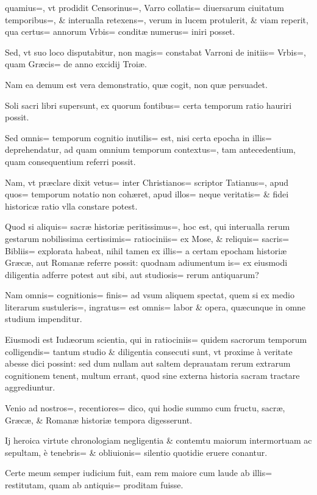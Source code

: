 \begin{parnumbers}

quamius=, vt prodidit Censorinus=, Varro collatis= diuersarum ciuitatum temporibus=, \& interualla retexens=, verum in lucem protulerit, \& viam reperit, qua certus=
annorum Vrbis= conditæ numerus= iniri posset.

Sed, vt suo loco disputabitur, non magis= constabat Varroni de initiis= Vrbis=, quam Græcis= de anno excidij Troiæ.

Nam ea demum est vera demonstratio, quæ cogit, non quæ persuadet.

Soli sacri libri supersunt, ex quorum fontibus= certa temporum ratio hauriri possit.

Sed omnis= temporum cognitio inutilis= est, nisi certa epocha in illis= deprehendatur, ad quam omnium temporum contextus=, tam antecedentium, quam consequentium referri possit.

Nam, vt præclare dixit vetus= inter Christianos= scriptor Tatianus=, apud quos= temporum notatio non cohæret, apud illos= neque veritatis= \& fidei historicæ ratio vlla constare potest.

Quod si aliquis= sacræ historiæ peritissimus=, hoc est, qui interualla rerum gestarum
nobilissima certissimis= ratiociniis= ex Mose, \& reliquis= sacris= Bibliis= explorata habeat, nihil tamen ex illis= a certam epocham historiæ Græcæ, aut Romanæ referre possit: quodnam adiumentum is= ex eiusmodi diligentia adferre potest aut sibi, aut studiosis= rerum antiquarum?

Nam omnis= cognitionis= finis= ad vsum aliquem spectat, quem si ex medio literarum sustuleris=, ingratus= est omnis= labor \& opera, quæcunque in omne studium impenditur.

Eiusmodi est Iudæorum scientia, qui in ratiociniis= quidem sacrorum temporum colligendis= tantum studio \& diligentia consecuti sunt, vt proxime à veritate abesse dici possint: sed dum nullam aut saltem deprauatam rerum extrarum cognitionem tenent, multum errant, quod sine externa historia sacram tractare
aggrediuntur.

Venio ad nostros=, recentiores= dico, qui hodie summo cum fructu, sacræ, Græcæ, \& Romanæ historiæ tempora digesserunt.

Ij heroica virtute chronologiam negligentia \& contemtu maiorum intermortuam ac sepultam, è tenebris= \& obliuionis= silentio quotidie eruere conantur.

Certe meum semper iudicium fuit, eam rem maiore cum laude ab illis= restitutam, quam ab antiquis= proditam fuisse.


\end{parnumbers}
